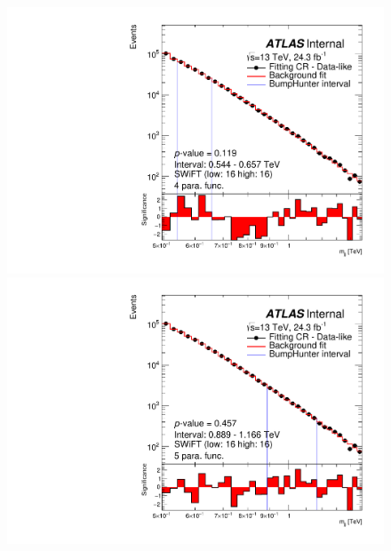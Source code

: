 \begin{figure}[!htb]
\captionsetup[subfigure]{aboveskip=0pt,justification=centering}
\centering
{} {
  \includegraphics[width=0.45\linewidth, angle=0]{figs/Dibjet/LowMass/FitStudy/bhFit_corrFitCR_dataLike_v13_4para_low16_high16.pdf}
}
 {
  \includegraphics[width=0.45\linewidth, angle=0]{figs/Dibjet/LowMass/FitStudy/bhFit_corrFitCR_dataLike_v13_5para_low16_high16.pdf}
}

\end{figure}
